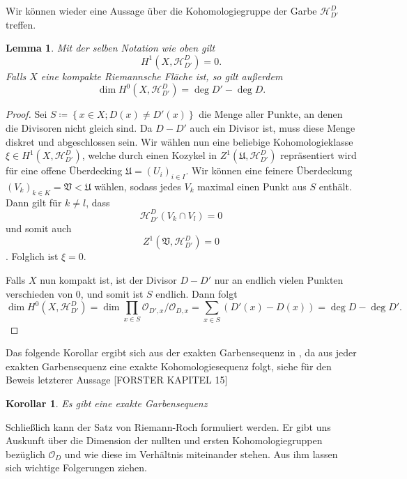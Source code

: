 \documentclass[11pt,a4paper]{scrartcl}
\theoremstyle{thm}
\newtheorem{lemma}{Lemma}[section]
\newtheorem{koro}{Korollar}[section]
\theoremstyle{def}
\theoremstyle{remark}
\begin{document}
Wir können wieder eine Aussage über die Kohomologiegruppe der Garbe $\mathcal{H}^D_{D'}$ treffen.
\begin{lemma}
	Mit der selben Notation wie oben gilt
	\[H^1(X,\mathcal{H}^D_{D'})=0.
	\]
	Falls $X$ eine kompakte Riemannsche Fläche ist, so gilt außerdem 
	\[
	\dim H^0(X,\mathcal{H}^D_{D'})=\deg D'-\deg D.
	\]
	\end{lemma}
\begin{proof}
Sei $S\coloneqq\left\{x\in X;D(x)\neq D'(x)\right\}$ die Menge aller Punkte, an denen die Divisoren nicht gleich sind. Da $D-D'$ auch ein Divisor ist, muss diese Menge diskret und abgeschlossen sein. Wir wählen nun eine beliebige Kohomologieklasse $\xi\in H^1(X,\mathcal{H}^D_{D'})$, welche durch einen Kozykel in $Z^1(\mathfrak{U},\mathcal{H}^D_{D'})$ repräsentiert wird für eine offene Überdecking $\mathfrak{U}=(U_i)_{i\in I}$. Wir können eine feinere Überdeckung $(V_k)_{k\in K}=\mathfrak{V}<\mathfrak{U}$ wählen, sodass jedes $V_k$ maximal einen Punkt aus $S$ enthält. Dann gilt für $k\neq l$, dass 
\[\mathcal{H}^D_{D'}(V_k\cap V_l)=0
\] 
und somit auch \[Z^1(\mathfrak{V},\mathcal{H}^D_{D'})=0\]. Folglich ist $\xi = 0$.

Falls $X$ nun kompakt ist, ist der Divisor $D-D'$ nur an endlich vielen Punkten verschieden von $0$, und somit ist $S$ endlich. Dann folgt
\[ \dim H^0(X,\mathcal{H}^D_{D'})=\dim \prod_{x\in S} \mathcal{O}_{D',x}/\mathcal{O}_{D,x}=\sum_{x\in S} (D'(x)-D(x))=\deg D-\deg D'.
\]

\end{proof}
Das folgende Korollar ergibt sich aus der exakten Garbensequenz in , da aus jeder exakten Garbensequenz eine exakte Kohomologiesequenz folgt, siehe für den Beweis letzterer Aussage [FORSTER KAPITEL 15]
\begin{koro}
	Es gibt eine exakte Garbensequenz
	\begin{center}
	\end{center}
\end{koro}
Schließlich kann der Satz von Riemann-Roch formuliert werden. Er gibt uns Auskunft über die Dimension der nullten und ersten Kohomologiegruppen bezüglich $\mathcal{O}_D$ und wie diese im Verhältnis miteinander stehen. Aus ihm lassen sich wichtige Folgerungen ziehen.
\end{document}
